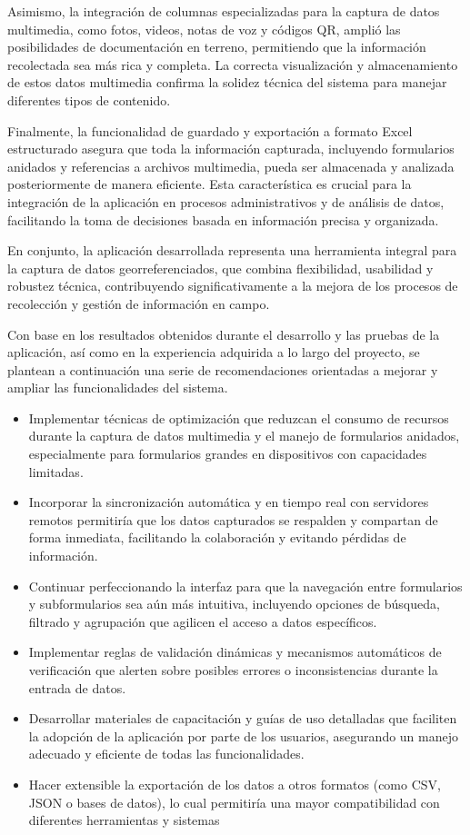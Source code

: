 \documentclass{article}
\begin{document}
Asimismo, la integración de columnas especializadas para la captura de datos multimedia, como fotos, videos, notas de voz y códigos QR, amplió las posibilidades de documentación en terreno, permitiendo que la información recolectada sea más rica y completa. La correcta visualización y almacenamiento de estos datos multimedia confirma la solidez técnica del sistema para manejar diferentes tipos de contenido.

Finalmente, la funcionalidad de guardado y exportación a formato Excel estructurado asegura que toda la información capturada, incluyendo formularios anidados y referencias a archivos multimedia, pueda ser almacenada y analizada posteriormente de manera eficiente. Esta característica es crucial para la integración de la aplicación en procesos administrativos y de análisis de datos, facilitando la toma de decisiones basada en información precisa y organizada.

En conjunto, la aplicación desarrollada representa una herramienta integral para la captura de datos georreferenciados, que combina flexibilidad, usabilidad y robustez técnica, contribuyendo significativamente a la mejora de los procesos de recolección y gestión de información en campo.

Con base en los resultados obtenidos durante el desarrollo y las pruebas de la aplicación, así como en la experiencia adquirida a lo largo del proyecto, se plantean a continuación una serie de recomendaciones orientadas a mejorar y ampliar las funcionalidades del sistema. 

\begin{itemize}
  \item Implementar técnicas de optimización que reduzcan el consumo de recursos durante la captura de datos multimedia y el manejo de formularios anidados, especialmente para formularios grandes en dispositivos con capacidades limitadas.
  \item Incorporar la sincronización automática y en tiempo real con servidores remotos permitiría que los datos capturados se respalden y compartan de forma inmediata, facilitando la colaboración y evitando pérdidas de información.
  \item Continuar perfeccionando la interfaz para que la navegación entre formularios y subformularios sea aún más intuitiva, incluyendo opciones de búsqueda, filtrado y agrupación que agilicen el acceso a datos específicos.
  \item Implementar reglas de validación dinámicas y mecanismos automáticos de verificación que alerten sobre posibles errores o inconsistencias durante la entrada de datos.
  \item Desarrollar materiales de capacitación y guías de uso detalladas que faciliten la adopción de la aplicación por parte de los usuarios, asegurando un manejo adecuado y eficiente de todas las funcionalidades.
  \item Hacer extensible la exportación de los datos a otros formatos (como CSV, JSON o bases de datos), lo cual permitiría una mayor compatibilidad con diferentes herramientas y sistemas
\end{itemize}
\end{document}
